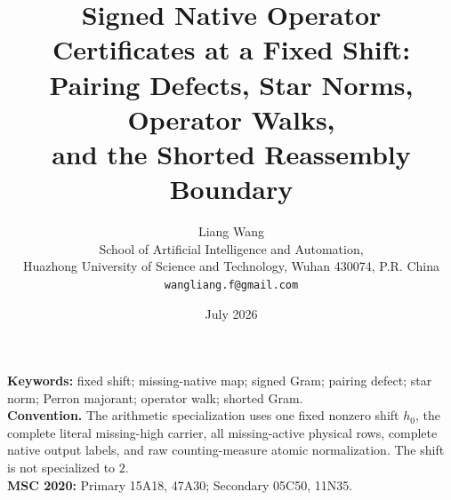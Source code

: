 \documentclass[11pt]{article}
\title{Signed Native Operator Certificates at a Fixed Shift:\\
Pairing Defects, Star Norms, Operator Walks,\\
and the Shorted Reassembly Boundary}
\author{Liang Wang\\
School of Artificial Intelligence and Automation,\\
Huazhong University of Science and Technology, Wuhan 430074, P.R. China\\
\texttt{wangliang.f@gmail.com}}
\date{July 2026}
\theoremstyle{remark}
\begin{document}
\maketitle


\noindent\textbf{Keywords:} fixed shift; missing-native map; signed Gram;
pairing defect; star norm; Perron majorant; operator walk; shorted Gram.\\[0.5em]
\noindent\textbf{Convention.} The arithmetic specialization uses one fixed
nonzero shift \(h_0\), the complete literal missing-high carrier, all
missing-active physical rows, complete native output labels, and raw
counting-measure atomic normalization.  The shift is not specialized to
\(2\).\\[0.5em]
\noindent\textbf{MSC 2020:} Primary 15A18, 47A30; Secondary 05C50, 11N35.












\begingroup
\small
\raggedright


\endgroup
\end{document}
